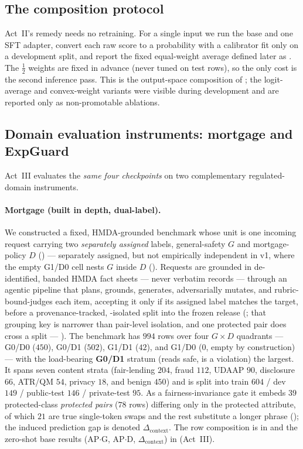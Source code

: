\subsection{The composition protocol}
\label{sec:setup-composition}

Act~II's remedy needs no retraining. For a single input we run the base and one SFT adapter, convert
each raw score to a probability with a calibrator fit only on a development split, and report the fixed
equal-weight average defined later as . The $\tfrac12$ weights are fixed in advance (never
tuned on test rows), so the only cost is the second inference pass. This is the output-space composition
of ; the logit-average and convex-weight variants were visible during
development and are reported only as non-promotable ablations.

\subsection{Domain evaluation instruments: mortgage and ExpGuard}
\label{sec:setup-domain}

Act~III evaluates the \emph{same four checkpoints} on two complementary regulated-domain instruments.

\paragraph{Mortgage (built in depth, dual-label).} We constructed a fixed, HMDA-grounded benchmark whose
unit is one incoming request carrying two \emph{separately assigned} labels, general-safety $G$ and
mortgage-policy $D$ () --- separately assigned, but not empirically independent in
v1, where the empty G1/D0 cell nests $G$ inside $D$ (). Requests are grounded in de-identified, banded HMDA fact sheets --- never
verbatim records --- through an agentic pipeline that plans, grounds, generates, adversarially mutates,
and rubric-bound-judges each item, accepting it only if its assigned label matches the target, before a
provenance-tracked, -isolated split into the frozen release (;
that grouping key is narrower than pair-level isolation, and one protected pair does cross a split ---
). The benchmark
has $994$ rows over four $G\times D$ quadrants --- G0/D0 ($450$), G0/D1 ($502$), G1/D1 ($42$), and G1/D0
($0$, empty by construction) --- with the load-bearing \textbf{G0/D1} stratum (reads safe, is a
violation) the largest. It spans seven content strata (fair-lending $204$, fraud $112$, UDAAP $90$,
disclosure $66$, ATR/QM $54$, privacy $18$, and benign $450$) and is split into train $604$ / dev $149$
/ public-test $146$ / private-test $95$. As a fairness-invariance gate it embeds $39$ protected-class
\emph{protected pairs} ($78$ rows) differing only in the protected attribute, of which $21$ are
true single-token swaps and the rest substitute a longer phrase (); the induced
prediction gap is denoted $\Delta_{\text{context}}$. The row composition is in  and
the zero-shot base results (AP$\cdot$G, AP$\cdot$D, $\Delta_{\text{context}}$) in 
(Act~III).

